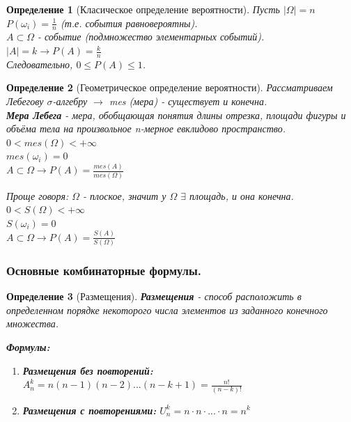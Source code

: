 \documentclass[14pt]{extarticle}
\theoremstyle{breakstyle}
\newtheorem{definition}{Определение}[subsection]
\begin{document}
\begin{definition}[Класическое определение вероятности]

Пусть $\mid \Omega \mid = n$
$P(\omega_i) = \frac{1}{n}$ (т.е. события равновероятны). \\
$A \subset \Omega$ - событие (подмножество элементарных событий). \\
$\mid A \mid = k \rightarrow P(A) = \frac{k}{n}$ \\
Следовательно, $0 \leq P(A) \leq 1$.

\end{definition}

\begin{definition}[Геометрическое определение вероятности]

Рассматриваем Лебегову $\sigma$-алгебру $\rightarrow$ mes (мера) - существует и конечна. \\
\textbf{Мера Лебега} - мера, обобщающая понятия длины отрезка, площади фигуры и объёма тела на произвольное n-мерное евклидово пространство. \\

$0 < mes(\Omega) < +\infty$ \\
$mes(\omega_i) = 0$ \\
$A \subset \Omega \rightarrow P(A) = \frac{mes(A)}{mes(\Omega)}$

\vspace{\baselineskip}
Проще говоря:
$\Omega$ - плоское, значит у $\Omega$ $\exists$ площадь, и она конечна. \\
$0 < S(\Omega) < +\infty$ \\
$S(\omega_i) = 0$\\
$A \subset \Omega \rightarrow P(A) = \frac{S(A)}{S(\Omega)}$ \\

\end{definition}

\subsubsection{Основные комбинаторные формулы.}
\begin{definition}[Размещения]
\textbf{Размещения} - способ расположить в определенном порядке некоторого числа элементов из заданного конечного множества.

\vspace{\baselineskip}

\textbf{Формулы:}
\begin{enumerate}
    \item \textbf{Размещения без повторений:} $A_{n}^{k} = n(n-1)(n-2)...(n-k+1) = \frac{n!}{(n - k)!}$
    \item \textbf{Размещения с повторениями:} $U_{n}^{k} = n \cdot n \cdot ... \cdot n = {n}^{k}$
\end{enumerate}    

\end{definition}
\end{document}
